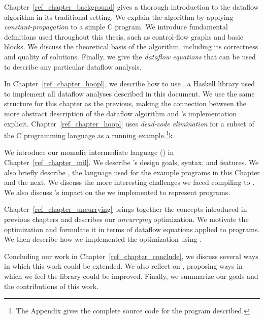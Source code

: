  Chapter~\ref{ref_chapter_background}  gives 
a thorough introduction to the dataflow algorithm in its traditional
setting. We explain the algorithm by
applying \emph{constant-propagation} to a simple C program. We
introduce fundamental definitions used throughout this thesis, such as
control-flow graphs and basic blocks. We discuss the theoretical basis
of the algorithm, including its correctness and quality of
solutions. Finally, we give the \emph{dataflow equations} that can be
used to describe any particular dataflow analysis.

 In Chapter~\ref{ref_chapter_hoopl},
we describe how to use \hoopl \citep{Hoopl-3.8.7.0}, a Haskell library
used to implement all dataflow analyses described in this document. We
use the same structure for this chapter as the previous, making the
connection between the more abstract description of the dataflow
algorithm and \hoopl's implementation
explicit. Chapter~\ref{ref_chapter_hoopl} uses \emph{dead-code
elimination} for a subset of the C programming language as a running
example.\footnote{The Appendix gives the complete
source code for the program described.}k

 We introduce our monadic 
intermediate language (\mil) in Chapter~\ref{ref_chapter_mil}. We describe
\mil's design goals, syntax, and features. We also briefly describe
\lamC, the language used for the example programs in this Chapter and the next. We
discuss the more interesting challenges we faced compiling \lamC
to \mil. We also discuss \hoopl's impact on the \ast we implemented to
represent \mil programs.

 Chapter~\ref{ref_chapter_uncurrying} brings
together the concepts introduced in previous chapters and describes our
\emph{uncurrying} optimization. We motivate the optimization and formulate it in terms
of dataflow equations applied to \mil programs. We then describe how
we implemented the optimization using \hoopl.

 Concluding our work in Chapter~\ref{ref_chapter_conclude}, we discuss
several ways in which this work could be extended. We also reflect
on \hoopl, proposing ways in which we feel the library could be
improved. Finally, we summarize our goals and the contributions of this work.


